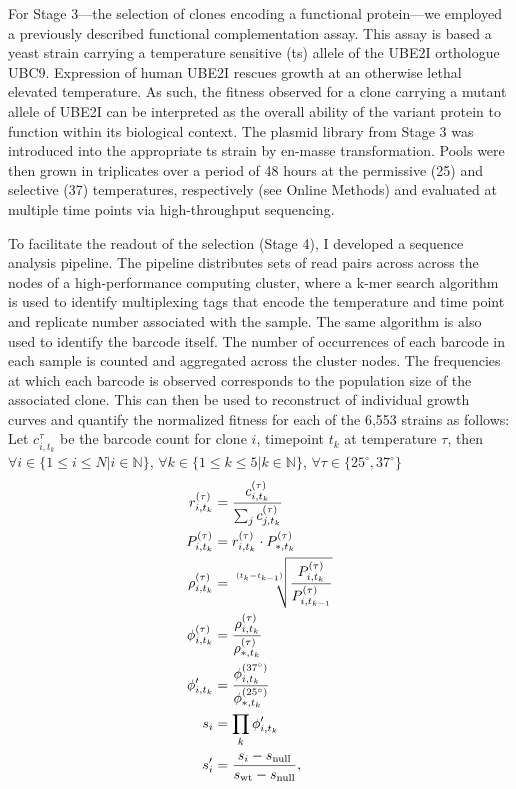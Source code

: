For Stage 3---the selection of clones encoding a functional protein---we employed a previously described  functional complementation assay\cite{5,13}. This assay is based a yeast strain carrying a temperature sensitive (ts) allele of the UBE2I orthologue UBC9. Expression of human UBE2I rescues growth at an otherwise lethal elevated temperature. As such, the fitness observed for a clone carrying a mutant allele of UBE2I can be interpreted as the overall ability of the variant protein to function within its biological context\cite{Song}. 
The plasmid library from Stage 3 was introduced into the appropriate ts strain by en-masse transformation. Pools were then grown in triplicates over a period of 48 hours at the permissive (25\celsius ) and selective (37\celsius ) temperatures, respectively (see Online Methods) and evaluated at multiple time points via high-throughput sequencing.

To facilitate the readout of the selection (Stage 4), I developed a sequence analysis pipeline. The pipeline distributes sets of read pairs across across the nodes of a high-performance computing cluster, where a k-mer search algorithm is used to identify multiplexing tags that encode the temperature and time point and replicate number associated with the sample. The same algorithm is also used to identify the barcode itself. The number of occurrences of each barcode in each sample is counted and aggregated across the cluster nodes. The frequencies at which each barcode is observed corresponds to the population size of the associated clone. This can then be used to reconstruct of individual growth curves and quantify the normalized fitness for each of the 6,553 strains as follows: Let $c_{i,t_k}^\tau$ be the barcode count for clone $i$, timepoint $t_k$ at temperature $\tau$, then $ \forall i \in \{1 \le i \le N | i \in \mathbb{N} \}$, 
$\forall k \in \{1 \le k \le 5 | k \in \mathbb{N} \}$, 
$\forall \tau \in \{25^{\circ},37^{\circ} \}$
\begin{align*}
r_{i,t_k}^{(\tau)} &= \frac{ c_{i,t_k}^{(\tau)} }{ \sum_j c_{j,t_k}^{(\tau)} }\\
P_{i,t_k}^{(\tau)} &= r_{i,t_k}^{(\tau)} \cdot P_{*,t_k}^{(\tau)} \\
\rho_{i,t_k}^{(\tau)} &= \sqrt[\uproot{5}(t_k - t_{k-1})]{\frac{P_{i,t_k}^{(\tau)}}{P_{i,t_{k-1}}^{(\tau)}}} \\
\phi_{i,t_k}^{(\tau)} &= \frac{\rho_{i,t_k}^{(\tau)}}{\rho_{*,t_k}^{(\tau)}}\\
\phi_{i,t_k}^\prime &= \frac{\phi_{i,t_k}^{(37^{\circ})}}{\phi_{*,t_k}^{(25^{\circ})}}\\
s_i &= \prod_k \phi_{i,t_k}^\prime \\
s'_i &= \frac{s_i - s_\text{null}}{s_\text{wt} - s_\text{null}},
\end{align*}

